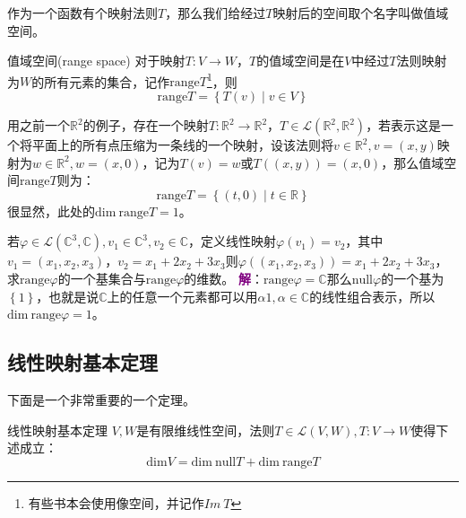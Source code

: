 作为一个函数有个映射法则$T$，那么我们给经过$T$映射后的空间取个名字叫做值域空间。

\begin{definition}{值域空间(range space)}
	对于映射$T:V\rightarrow W$，$T$的值域空间是在$V$中经过$T$法则映射为$W$的所有元素的集合，记作$\text{range}T$\footnote{有些书本会使用像空间，并记作$Im~T$}，则
	$$
	\text{range}T=\left\{ T(v)\mid v\in V \right\}
	$$
\end{definition}

用之前一个$\mathbb{R}^2$的例子，存在一个映射$T: \mathbb{R}^2\rightarrow \mathbb{R}^2$，$T\in \mathcal{L}(\mathbb{R}^2,\mathbb{R}^2)$，若表示这是一个将平面上的所有点压缩为一条线的一个映射，设该法则将$v\in \mathbb{R}^2,v=(x,y)$映射为$w\in \mathbb{R}^2,w=(x,0)$，记为$T(v)=w$或$T((x,y))=(x,0)$，那么值域空间$\text{range}T$则为：
$$
\text{range}T=\left\{ (t,0)\mid t\in \mathbb{R} \right\}
$$
很显然，此处的$\text{dim}~\text{range}T=1$。
\begin{example}
	若$\varphi \in \mathcal{L}(\mathbb{C}^3,\mathbb{C}),v_1\in \mathbb{C}^3,v_2\in \mathbb{C}$，定义线性映射$\varphi(v_1)=v_2$，其中$v_1=(x_1,x_2,x_3)$，$v_2=x_1+2x_2+3x_3$则$\varphi((x_1,x_2,x_3))=x_1+2x_2+3x_3$，求$\text{range}\varphi$的一个基集合与$\text{range}\varphi$的维数。
	\tcblower
	\textcolor{purple}{\textbf{解}}：$\text{range}\varphi=\mathbb{C}$那么$\text{null}\varphi$的一个基为$\left\{ 1 \right\}$，也就是说$\mathbb{C}$上的任意一个元素都可以用$\alpha 1,\alpha\in \mathbb{C}$的线性组合表示，所以$\text{dim}~\text{range}\varphi =1$。
\end{example}

\subsection{线性映射基本定理}

下面是一个非常重要的一个定理。

\begin{theorem}{线性映射基本定理}
	\label{the:important}
	$V,W$是有限维线性空间，法则$T\in\mathcal{L}(V,W),T:V\rightarrow W$使得下述成立：$$\text{dim}V=\text{dim}~\text{null}T+\text{dim}~\text{range}T$$
\end{theorem}

